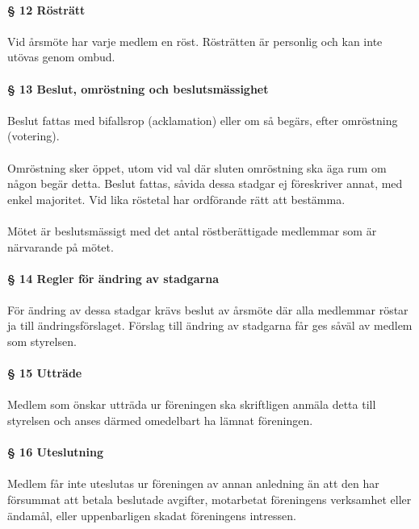 \documentclass[12pt, a4paper]{article}
\begin{document}
\paragraph{§ 12 Rösträtt}
\paragraph{}
Vid årsmöte har varje medlem en röst. Rösträtten är personlig och kan inte utövas genom ombud.

\paragraph{§ 13 Beslut, omröstning och beslutsmässighet}
\paragraph{}
Beslut fattas med bifallsrop (acklamation) eller om så begärs, efter omröstning (votering).

\paragraph{}
Omröstning sker öppet, utom vid val där sluten omröstning ska äga rum om någon begär detta. Beslut fattas, såvida dessa stadgar ej föreskriver
annat, med enkel majoritet. Vid lika röstetal har ordförande rätt att bestämma.

\paragraph{}
Mötet är beslutsmässigt med det antal röstberättigade medlemmar som är närvarande på mötet.

\paragraph{§ 14 Regler för ändring av stadgarna}
\paragraph{}
För ändring av dessa stadgar krävs beslut av årsmöte där alla medlemmar röstar ja till ändringsförslaget. Förslag till ändring av stadgarna får ges såväl av medlem som styrelsen.

\paragraph{§ 15 Utträde}
\paragraph{}
Medlem som önskar utträda ur föreningen ska skriftligen anmäla detta till styrelsen och anses därmed omedelbart ha lämnat föreningen.

\paragraph{§ 16 Uteslutning}
\paragraph{}
Medlem får inte uteslutas ur föreningen av annan anledning än att den har försummat att betala beslutade avgifter, motarbetat föreningens
verksamhet eller ändamål, eller uppenbarligen skadat föreningens intressen.
\end{document}

